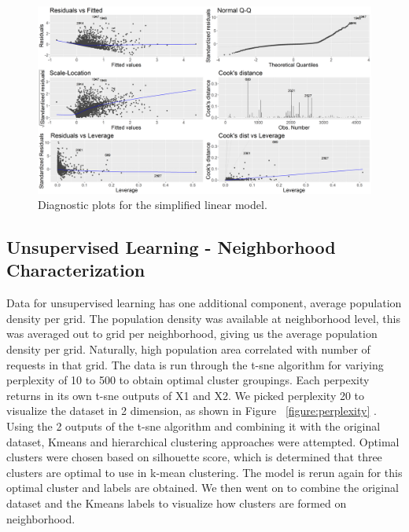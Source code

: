 \documentclass{llncs}
\begin{document}
\FloatBarrier
\begin{figure}
 	\includegraphics[width=\textwidth, height=\textheight, keepaspectratio]{000LinearModelReducedDiagnostics.png}
 	\caption{Diagnostic plots for the simplified linear model.}
	\label{figure:Diags}

\end{figure}
\FloatBarrier

\subsection{Unsupervised Learning - Neighborhood Characterization}
Data for unsupervised learning has one additional component, average population density per grid. The population density was available at neighborhood level, this was averaged out to grid per neighborhood, giving us the average population density per grid. Naturally, high population area correlated with number of requests in that grid. The data is run through the t-sne algorithm for variying perplexity of 10 to 500 to obtain optimal cluster groupings. Each perpexity returns in its own t-sne outputs of X1 and X2. We picked perplexity 20 to visualize the dataset in 2 dimension, as shown in Figure ~\ref{figure:perplexity} . Using the 2 outputs of the t-sne algorithm and combining it with the original dataset, Kmeans and hierarchical clustering approaches were attempted. Optimal clusters were chosen based on silhouette score, which is determined that three clusters are optimal to use in k-mean clustering. The model is rerun again for this optimal cluster and labels are obtained. We then went on to combine the original dataset and the Kmeans labels to visualize how clusters are formed on neighborhood.
\end{document}
